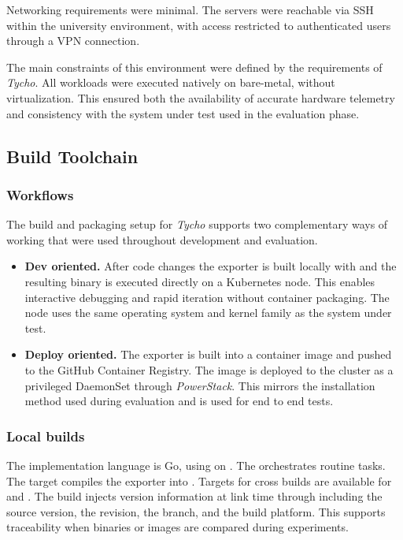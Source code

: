 Networking requirements were minimal. The servers were reachable via SSH within the university environment, with access restricted to authenticated users through a VPN connection.

The main constraints of this environment were defined by the requirements of \textit{Tycho}. All workloads were executed natively on bare-metal, without virtualization. This ensured both the availability of accurate hardware telemetry and consistency with the system under test used in the evaluation phase.

\subsection{Build Toolchain}
\label{sec:tycho_sysenv_build}

\subsubsection{Workflows}
\label{subsec:tycho_sysenv_build_workflows}
The build and packaging setup for \textit{Tycho} supports two complementary ways of working that were used throughout development and evaluation.

\begin{itemize}
  \item \textbf{Dev oriented.} After code changes the exporter is built locally with  and the resulting binary is executed directly on a Kubernetes node. This enables interactive debugging and rapid iteration without container packaging. The node uses the same operating system and kernel family as the system under test.
  \item \textbf{Deploy oriented.} The exporter is built into a container image and pushed to the GitHub Container Registry. The image is deployed to the cluster as a privileged DaemonSet through \textit{PowerStack}. This mirrors the installation method used during evaluation and is used for end to end tests.
\end{itemize}

\subsubsection{Local builds}
\label{subsec:tycho_sysenv_build_local}
The implementation language is Go, using  on . The  orchestrates routine tasks. The target  compiles the exporter into . Targets for cross builds are available for  and . The build injects version information at link time through  including the source version, the revision, the branch, and the build platform. This supports traceability when binaries or images are compared during experiments.

